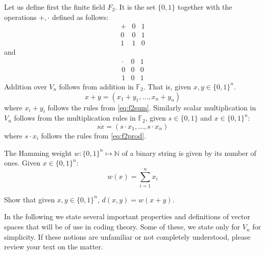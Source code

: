 Let us define first the finite field $F_2$. It is the set $\{0,1\}$ together with the operations $+,\cdot$ defined as follows:
\begin{equation}
\label{eq:f2sum}
\begin{array}{c|cc}
+ & 0 & 1 \\
\hline
0 & 0 & 1 \\
1 & 1 & 0 
\end{array}
\end{equation}
and
\begin{equation}
\label{eq:f2prod}
\begin{array}{c|cc}
\cdot & 0 & 1 \\
\hline
0 & 0 & 0 \\
1 & 0 & 1 
\end{array}
\end{equation}
Addition over $V_n$ follows from addition in $\mathbb F_2$. That is, given $x,y\in\{0,1\}^n$.
\begin{equation}
x+y=(x_1+y_1,\ldots,x_n+y_n)
\end{equation}
where $x_i+y_i$ follows the rules from \eqref{eq:f2sum}. Similarly scalar multiplication in $V_n$ follows from the multiplication rules in $\mathbb F_2$, given $s\in\{0,1\}$ and $x\in\{0,1\}^n$:
\begin{equation}
s\dot x=(s\cdot x_1,\ldots,s\cdot x_n)
\end{equation}
where $s\cdot x_i$ follows the rules from \eqref{eq:f2prod}.
\begin{definition}
The Hamming weight $w:\{0,1\}^n\mapsto\mathbb N$ of a binary string is given by its number of ones. Given $x\in\{0,1\}^n$:
\begin{equation}
w(x)=\sum_{i=1}^nx_i
\end{equation}
\end{definition}


\begin{exercise}
Show that given $x,y\in\{0,1\}^n$, $d(x,y)=w(x+y)$.
\end{exercise}
In the following we state several important properties and definitions of vector spaces that will be of use in coding theory. Some of these, we state only for $V_n$ for simplicity. If these notions are unfamiliar or not completely understood, please review your text on the matter.

